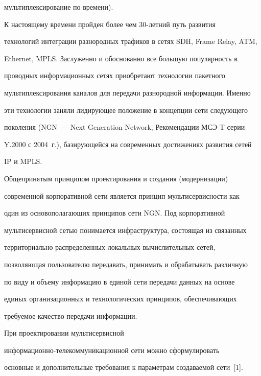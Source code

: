 мультиплексирование по времени).


      


      К настоящему времени пройден более чем 30-летний путь развития 


технологий интеграции разнородных трафиков в сетях SDH, Frame Relay, ATM, 


Ethernet, MPLS. Заслуженно и обоснованно все большую популярность в 


проводных информационных сетях приобретают технологии пакетного 


мультиплексирования каналов для передачи разнородной информации. Именно 


эти технологии заняли лидирующее положение в концепции сети следующего 


поколения (NGN~--- Next Generation Network, Рекомендации МСЭ-T серии 


Y.2000 с 2004~г.), бази\-ру\-ющей\-ся на современных достижениях развития сетей 


IP и MPLS.


      


      Общепринятым принципом проектирования и создания (модернизации) 


современной корпоративной сети является принцип мультисервисности как 


один из основополагающих принципов сети NGN. Под корпоративной 


мультисервисной сетью понимается инфраструктура, состоящая из связанных 


территориально распределенных локальных вычислительных сетей, 


позволяющая пользователю передавать, принимать и обрабатывать различную 


по виду и объему информацию в единой сети передачи данных на основе 


единых организационных и технологических принципов, обеспечивающих 


требуемое качество передачи информации. 


      


      При проектировании мультисервисной 


      информационно-те\-ле\-ком\-му\-ни\-ка\-ци\-он\-ной сети можно сформулировать 


основные и дополнительные требования к параметрам создаваемой сети~[1]. 


